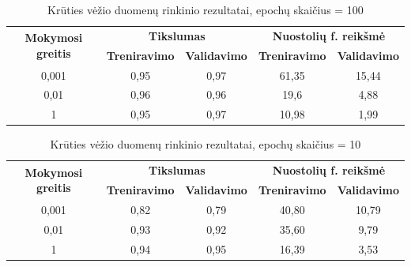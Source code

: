 \documentclass{VUMIFPSbakalaurinis}
\begin{document}
\begin{table}[]
  \centering
  \caption{Krūties vėžio duomenų rinkinio rezultatai, epochų skaičius = 100}{
  \begin{tabular}{|c|cc|cc|}
  \hline
  \multirow{2}{*}{\textbf{Mokymosi greitis}} & \multicolumn{2}{c|}{\textbf{Tikslumas}}                         & \multicolumn{2}{c|}{\textbf{Nuostolių f. reikšmė}}              \\ \cline{2-5} 
                                             & \multicolumn{1}{c|}{\textbf{Treniravimo}} & \textbf{Validavimo} & \multicolumn{1}{c|}{\textbf{Treniravimo}} & \textbf{Validavimo} \\ \hline
  0,001                                      & \multicolumn{1}{c|}{0,95}                 & 0,97                & \multicolumn{1}{c|}{61,35}                & 15,44               \\ \hline
  0,01                                       & \multicolumn{1}{c|}{0,96}                 & 0,96                & \multicolumn{1}{c|}{19,6}                 & 4,88                \\ \hline
  1                                          & \multicolumn{1}{c|}{0,95}                 & 0,97                & \multicolumn{1}{c|}{10,98}                & 1,99                \\ \hline
  \end{tabular}}
  \label{tab:e-100-cancer-sig}
  \end{table}

\begin{table}[]
  \centering
  \caption{Krūties vėžio duomenų rinkinio rezultatai, epochų skaičius = 10}{
  \begin{tabular}{|c|cc|cc|}
  \hline
  \multirow{2}{*}{\textbf{Mokymosi greitis}} & \multicolumn{2}{c|}{\textbf{Tikslumas}}                         & \multicolumn{2}{c|}{\textbf{Nuostolių f. reikšmė}}              \\ \cline{2-5} 
                                             & \multicolumn{1}{c|}{\textbf{Treniravimo}} & \textbf{Validavimo} & \multicolumn{1}{c|}{\textbf{Treniravimo}} & \textbf{Validavimo} \\ \hline
  0,001                                      & \multicolumn{1}{c|}{0,82}                 & 0,79                & \multicolumn{1}{c|}{40,80}                & 10,79               \\ \hline
  0,01                                       & \multicolumn{1}{c|}{0,93}                 & 0,92                & \multicolumn{1}{c|}{35,60}                & 9,79                \\ \hline
  1                                          & \multicolumn{1}{c|}{0,94}                 & 0,95                & \multicolumn{1}{c|}{16,39}                & 3,53                \\ \hline
  \end{tabular}}
  \label{tab:e-10-cancer-sig}
  \end{table}
\end{document}
